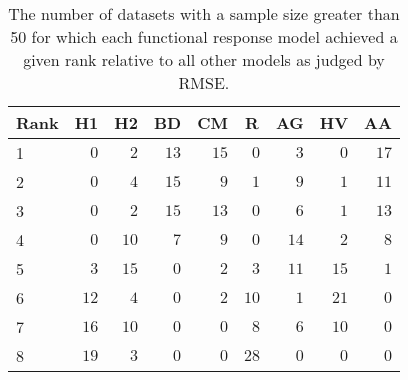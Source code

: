 \begin{table}[!tbp]
\caption{The number of datasets with a sample size greater than 50 for which each functional response model achieved a given rank relative to all other models as judged by RMSE.\label{table:RMSE_rankings}} 
\begin{center}
\begin{tabular}{lrrrrrrrr}
\hline\hline
\multicolumn{1}{l}{Rank}&\multicolumn{1}{c}{H1}&\multicolumn{1}{c}{H2}&\multicolumn{1}{c}{BD}&\multicolumn{1}{c}{CM}&\multicolumn{1}{c}{R}&\multicolumn{1}{c}{AG}&\multicolumn{1}{c}{HV}&\multicolumn{1}{c}{AA}\tabularnewline
\hline
1&$ 0$&$ 2$&$13$&$15$&$ 0$&$ 3$&$ 0$&$17$\tabularnewline
2&$ 0$&$ 4$&$15$&$ 9$&$ 1$&$ 9$&$ 1$&$11$\tabularnewline
3&$ 0$&$ 2$&$15$&$13$&$ 0$&$ 6$&$ 1$&$13$\tabularnewline
4&$ 0$&$10$&$ 7$&$ 9$&$ 0$&$14$&$ 2$&$ 8$\tabularnewline
5&$ 3$&$15$&$ 0$&$ 2$&$ 3$&$11$&$15$&$ 1$\tabularnewline
6&$12$&$ 4$&$ 0$&$ 2$&$10$&$ 1$&$21$&$ 0$\tabularnewline
7&$16$&$10$&$ 0$&$ 0$&$ 8$&$ 6$&$10$&$ 0$\tabularnewline
8&$19$&$ 3$&$ 0$&$ 0$&$28$&$ 0$&$ 0$&$ 0$\tabularnewline
\hline
\end{tabular}\end{center}
\end{table}
